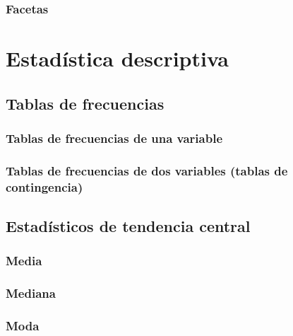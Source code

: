 \documentclass[
]{book}
\theoremstyle{definition}
\theoremstyle{definition}
\theoremstyle{definition}
\theoremstyle{definition}
\theoremstyle{remark}
\begin{document}
\hypertarget{facetas}{%
\subsection{Facetas}\label{facetas}}

\hypertarget{estaduxedstica-descriptiva}{%
\chapter{Estadística descriptiva}\label{estaduxedstica-descriptiva}}

\hypertarget{tablas-de-frecuencias}{%
\section{Tablas de frecuencias}\label{tablas-de-frecuencias}}

\hypertarget{tablas-de-frecuencias-de-una-variable}{%
\subsection{Tablas de frecuencias de una variable}\label{tablas-de-frecuencias-de-una-variable}}

\hypertarget{tablas-de-frecuencias-de-dos-variables-tablas-de-contingencia}{%
\subsection{Tablas de frecuencias de dos variables (tablas de contingencia)}\label{tablas-de-frecuencias-de-dos-variables-tablas-de-contingencia}}

\hypertarget{estaduxedsticos-de-tendencia-central}{%
\section{Estadísticos de tendencia central}\label{estaduxedsticos-de-tendencia-central}}

\hypertarget{media}{%
\subsection{Media}\label{media}}

\hypertarget{mediana}{%
\subsection{Mediana}\label{mediana}}

\hypertarget{moda}{%
\subsection{Moda}\label{moda}}
\end{document}
